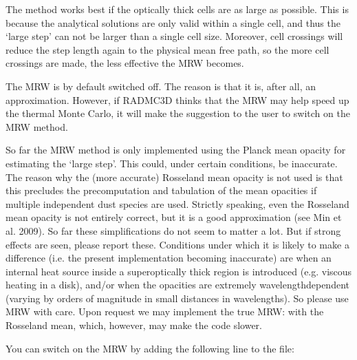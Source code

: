 \documentclass[letterpaper,10pt,english]{sphinxmanual}
\begin{document}
The method works best if the optically thick cells are as large as possible.
This is because the analytical solutions are only valid within a single cell,
and thus the ‘large step’ can not be larger than a single cell size.  Moreover,
cell crossings will reduce the step length again to the physical mean free path,
so the more cell crossings are made, the less effective the MRW becomes.

 The MRW is by default switched off. The reason is that it is, after all,
an approximation. However, if RADMC\sphinxhyphen{}3D thinks that the MRW may help speed up the
thermal Monte Carlo, it will make the suggestion to the user to switch on the
MRW method.

 So far the MRW method is only implemented using the Planck mean opacity
for estimating the ‘large step’. This could, under certain conditions, be
inaccurate. The reason why the (more accurate) Rosseland mean opacity is not
used is that this precludes the precomputation and tabulation of the mean
opacities if multiple independent dust species are used. Strictly speaking,
even the Rosseland mean opacity is not entirely correct, but it is a good
approximation (see Min et al. 2009). So far these simplifications do not seem
to matter a lot. But if strong effects are seen, please report these. Conditions
under which it is likely to make a difference (i.e.  the present implementation
becoming inaccurate) are when an internal heat source inside a super\sphinxhyphen{}optically
thick region is introduced (e.g. viscous heating in a disk), and/or when the
opacities are extremely wavelength\sphinxhyphen{}dependent (varying by orders of magnitude in
small distances in wavelengths). So please use MRW with care. Upon request we
may implement the true MRW: with the Rosseland mean, which, however, may make
the code slower.

You can switch on the MRW by adding the following line to the
 file:

\begin{sphinxVerbatim}[commandchars=\\\{\}]
  
\end{sphinxVerbatim}
\end{document}
